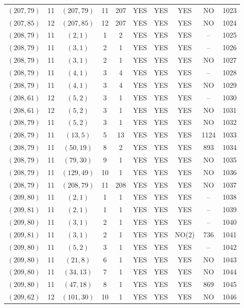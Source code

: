 \begin{longtable}{|c|c|c|c|c|c|c|c|c|c|}
$(207, 79)$ & 11 & $(207, 79)$ & 11 & 207 & YES & YES & YES & NO & 1023\\
$(207, 85)$ & 12 & $(207, 85)$ & 12 & 207 & YES & YES & YES & NO & 1024\\
$(208, 79)$ & 11 & $(2, 1)$ & 1 & 2 & YES & YES & YES & -- & 1025\\
$(208, 79)$ & 11 & $(3, 1)$ & 2 & 1 & YES & YES & YES & -- & 1026\\
$(208, 79)$ & 11 & $(3, 1)$ & 2 & 1 & YES & YES & YES & NO & 1027\\
$(208, 79)$ & 11 & $(4, 1)$ & 3 & 4 & YES & YES & YES & -- & 1028\\
$(208, 79)$ & 11 & $(4, 1)$ & 3 & 4 & YES & YES & YES & NO & 1029\\
$(208, 61)$ & 12 & $(5, 2)$ & 3 & 1 & YES & YES & YES & -- & 1030\\
$(208, 61)$ & 12 & $(5, 2)$ & 3 & 1 & YES & YES & YES & NO & 1031\\
$(208, 79)$ & 11 & $(5, 2)$ & 3 & 1 & YES & YES & YES & NO & 1032\\
$(208, 79)$ & 11 & $(13, 5)$ & 5 & 13 & YES & YES & YES & 1124 & 1033\\
$(208, 79)$ & 11 & $(50, 19)$ & 8 & 2 & YES & YES & YES & 893 & 1034\\
$(208, 79)$ & 11 & $(79, 30)$ & 9 & 1 & YES & YES & YES & NO & 1035\\
$(208, 79)$ & 11 & $(129, 49)$ & 10 & 1 & YES & YES & YES & NO & 1036\\
$(208, 79)$ & 11 & $(208, 79)$ & 11 & 208 & YES & YES & YES & NO & 1037\\
$(209, 80)$ & 11 & $(2, 1)$ & 1 & 1 & YES & YES & YES & -- & 1038\\
$(209, 81)$ & 11 & $(2, 1)$ & 1 & 1 & YES & YES & YES & -- & 1039\\
$(209, 80)$ & 11 & $(3, 1)$ & 2 & 1 & YES & YES & YES & -- & 1040\\
$(209, 81)$ & 11 & $(3, 1)$ & 2 & 1 & YES & YES & NO(2) & 736 & 1041\\
$(209, 80)$ & 11 & $(5, 2)$ & 3 & 1 & YES & YES & YES & -- & 1042\\
$(209, 80)$ & 11 & $(21, 8)$ & 6 & 1 & YES & YES & YES & NO & 1043\\
$(209, 80)$ & 11 & $(34, 13)$ & 7 & 1 & YES & YES & YES & NO & 1044\\
$(209, 80)$ & 11 & $(47, 18)$ & 8 & 1 & YES & YES & YES & 869 & 1045\\
$(209, 62)$ & 12 & $(101, 30)$ & 10 & 1 & YES & YES & YES & NO & 1046\\

\end{longtable}
